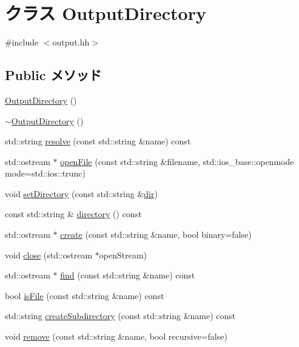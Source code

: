 \hypertarget{classOutputDirectory}{
\section{クラス OutputDirectory}
\label{classOutputDirectory}
}


{\ttfamily \#include $<$output.hh$>$}\subsection*{Public メソッド}
\begin{DoxyCompactItemize}
\item 
\hyperlink{classOutputDirectory_a0ccc7a2d2bdd34073949e2fbccb58a3b}{OutputDirectory} ()
\item 
\hyperlink{classOutputDirectory_a9257cd7515c7b1a88a4de758c2f00d46}{$\sim$OutputDirectory} ()
\item 
std::string \hyperlink{classOutputDirectory_abfb043ef04e73fe88fb002c53447a348}{resolve} (const std::string \&name) const 
\item 
std::ostream $\ast$ \hyperlink{classOutputDirectory_a7539f53b63a43ef7cf4df2a38b891a2e}{openFile} (const std::string \&filename, std::ios\_\-base::openmode mode=std::ios::trunc)
\item 
void \hyperlink{classOutputDirectory_a3133e5972e0fa144664a06a665c01e74}{setDirectory} (const std::string \&\hyperlink{classOutputDirectory_ae1eb8abe7f66572b89cc139ca0c841ac}{dir})
\item 
const std::string \& \hyperlink{classOutputDirectory_a89b2e59c89cc0aa42fdcdf8a6440656e}{directory} () const 
\item 
std::ostream $\ast$ \hyperlink{classOutputDirectory_a22e4aa8ec29a265a1c299a1a009c85cc}{create} (const std::string \&name, bool binary=false)
\item 
void \hyperlink{classOutputDirectory_a3cc929ea4ca094903ac826046d510634}{close} (std::ostream $\ast$openStream)
\item 
std::ostream $\ast$ \hyperlink{classOutputDirectory_a4b6800ca94a140ee14fcdb169be55027}{find} (const std::string \&name) const 
\item 
bool \hyperlink{classOutputDirectory_aef33355da98c5680209c66135f10ad2f}{isFile} (const std::string \&name) const 
\item 
std::string \hyperlink{classOutputDirectory_ac2ac87b6b1da98eb0f0fdb2ecbc34c6f}{createSubdirectory} (const std::string \&name) const 
\item 
void \hyperlink{classOutputDirectory_a6eb2aac9c800b6ab1640ec5d8e0bdec1}{remove} (const std::string \&name, bool recursive=false)
\end{DoxyCompactItemize}
